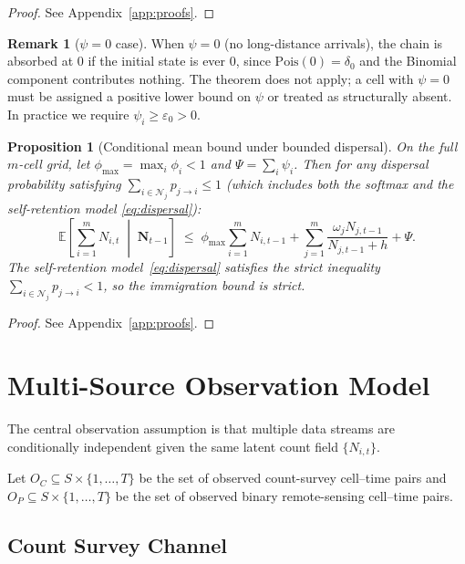 \documentclass[review,12pt]{elsarticle}
\newtheorem{proposition}[theorem]{Proposition}
\theoremstyle{definition}
\newtheorem{remark}{Remark}
\newcommand{\E}{\mathbb{E}}
\begin{document}
\begin{proof}
See Appendix~\ref{app:proofs}.
\end{proof}

\begin{remark}[$\psi=0$ case]
When $\psi=0$ (no long-distance arrivals), the chain is absorbed at 0 if
the initial state is ever 0, since $\mathrm{Pois}(0)=\delta_0$ and the
Binomial component contributes nothing.  The theorem does not apply;
a cell with $\psi=0$ must be assigned a positive lower bound on $\psi$
or treated as structurally absent.  In practice we require $\psi_i\ge\varepsilon_0>0$.
\end{remark}

\begin{proposition}[Conditional mean bound under bounded dispersal]
\label{prop:bound}
On the full $m$-cell grid, let $\phi_{\max}=\max_i\phi_i<1$ and
$\Psi=\sum_i\psi_i$.  Then for any dispersal probability satisfying
$\sum_{i\in\mathcal{N}_j}p_{j\to i}\le1$ (which includes both the softmax
and the self-retention model \eqref{eq:dispersal}):
\[
  \E\!\left[\sum_{i=1}^m N_{i,t}\;\middle|\;\bm{N}_{t-1}\right]
  \;\le\;
  \phi_{\max}\sum_{i=1}^m N_{i,t-1}
  + \sum_{j=1}^m \frac{\omega_j N_{j,t-1}}{N_{j,t-1}+h}
  + \Psi.
\]
The self-retention model~\eqref{eq:dispersal} satisfies the strict inequality
$\sum_{i\in\mathcal{N}_j}p_{j\to i}<1$, so the immigration bound is strict.
\end{proposition}

\begin{proof}
See Appendix~\ref{app:proofs}.
\end{proof}

\section{Multi-Source Observation Model}\label{sec:obs}

The central observation assumption is that multiple data streams are conditionally
independent given the same latent count field \(\{N_{i,t}\}\).

Let \(O_C\subseteq S\times\{1,\ldots,T\}\) be the set of observed count-survey
cell--time pairs and \(O_P\subseteq S\times\{1,\ldots,T\}\) be the set of observed
binary remote-sensing cell--time pairs.

\subsection{Count Survey Channel}
\end{document}
